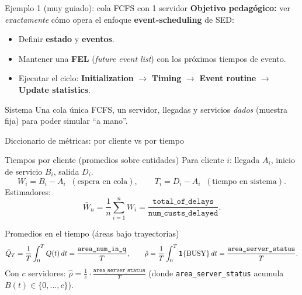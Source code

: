 \documentclass[aspectratio=1610, 9pt]{beamer}
\begin{document}
\begin{frame}{Ejemplo 1 (muy guiado): cola FCFS con 1 servidor}
\small
\textbf{Objetivo pedagógico:} ver \emph{exactamente} cómo opera el enfoque \textbf{event-scheduling} de SED:
\begin{itemize}
\item Definir \textbf{estado} y \textbf{eventos}.
\item Mantener una \textbf{FEL} (\emph{future event list}) con los próximos tiempos de evento.
\item Ejecutar el ciclo: \textbf{Initialization} $\to$ \textbf{Timing} $\to$ \textbf{Event routine} $\to$ \textbf{Update statistics}.
\end{itemize}

\vspace{4pt}
\begin{block}{Sistema}
Una cola única FCFS, un servidor, llegadas y servicios \emph{dados} (muestra fija) para poder simular “a mano”.
\end{block}
\end{frame}


\begin{frame}{Diccionario de métricas: por cliente vs por tiempo}
\small
\begin{block}{Tiempos por cliente (promedios sobre entidades)}
Para cliente $i$: llegada $A_i$, inicio de servicio $B_i$, salida $D_i$.
\[
W_i=B_i-A_i \;\;(\text{espera en cola}),\qquad
T_i=D_i-A_i \;\;(\text{tiempo en sistema}).
\]
Estimadores:
\[
\bar W_n=\frac{1}{n}\sum_{i=1}^n W_i=\frac{\texttt{total\_of\_delays}}{\texttt{num\_custs\_delayed}}.
\]
\end{block}

\vspace{2pt}
\begin{block}{Promedios en el tiempo (áreas bajo trayectorias)}
\[
\bar Q_T=\frac{1}{T}\int_0^T Q(t)\,dt=\frac{\texttt{area\_num\_in\_q}}{T},
\qquad
\hat\rho=\frac{1}{T}\int_0^T \mathbf{1}\{\text{BUSY}\}\,dt=\frac{\texttt{area\_server\_status}}{T}.
\]
Con $c$ servidores: $\hat\rho=\frac{1}{c}\cdot\frac{\texttt{area\_server\_status}}{T}$ (donde \texttt{area\_server\_status} acumula $B(t)\in\{0,\dots,c\}$).
\end{block}
\end{frame}
\end{document}
